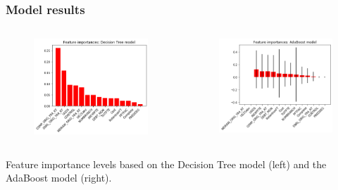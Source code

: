\documentclass{beamer}
\begin{document}
\begin{frame} 
\frametitle{Model results}
\begin{columns}
\column{2in}
\begin{figure}
\includegraphics[width=2in]{DTFeatureImportance.png}
\end{figure}

\column{2in}
\begin{figure}
\includegraphics[width=2in]{ABFeatureImportance.png}
\end{figure}
\end{columns}
\begin{center}
Feature importance levels based on the Decision Tree model (left) and the AdaBoost model (right).
\end{center}
\end{frame}
\end{document}
